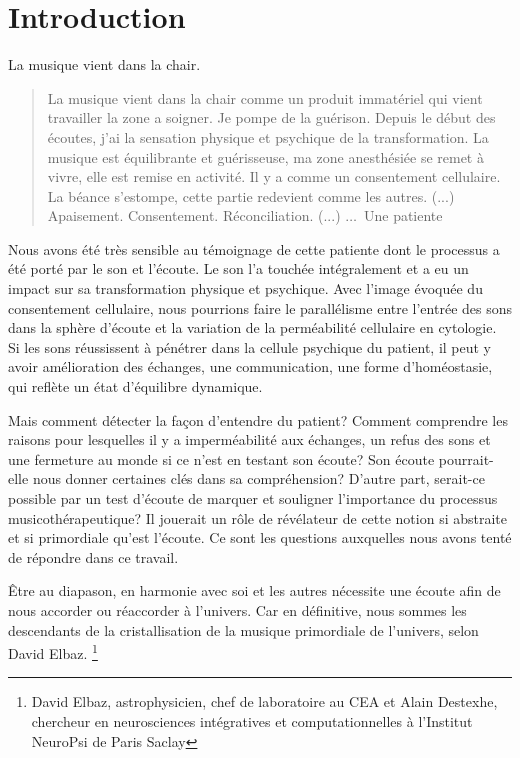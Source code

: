 \chapter{Introduction}

La musique vient dans la chair.

\begin{quotation}
 La musique vient dans la chair comme un produit immatériel
 qui vient travailler la zone a soigner. Je pompe de la
 guérison.
Depuis le début des écoutes, j'ai la sensation physique et
 psychique de la
 transformation.
 La musique est équilibrante et guérisseuse, ma zone
 anesthésiée se remet à vivre, elle est remise en activité.
 Il y a comme un consentement cellulaire.
La béance s'estompe, cette
partie redevient comme les autres. (...)
Apaisement. Consentement. Réconciliation.  (...)
$\ldots$\  Une patiente\autocite{propos d'une patiente}
\end{quotation}

Nous avons été très sensible au témoignage de cette patiente dont le
processus a été porté par le son et l'écoute. Le son l'a touchée intégralement et a eu un impact sur sa transformation physique
et psychique.
Avec l'image évoquée du
consentement cellulaire, nous pourrions faire le
parallélisme entre l'entrée des sons dans la sphère d'écoute et la variation de la 
perméabilité cellulaire en cytologie.\autocite[ch. 3 pp. 70--76]{marieb:biologie}  Si les sons réussissent à pénétrer dans la
cellule psychique du patient, il peut y avoir amélioration des
échanges, une 
communication, une forme d'homéostasie,  \autocite[ch. 1
pp. 10]{marieb:biologie} qui reflète un état d'équilibre dynamique.

Mais comment détecter la façon d'entendre du patient?
Comment comprendre les raisons pour lesquelles il y a imperméabilité aux
échanges, un refus des sons et une fermeture au monde si ce n'est en testant
son écoute?  Son écoute pourrait-elle nous donner certaines clés dans sa
compréhension? D'autre part, serait-ce  possible  par un test d'écoute
de marquer et souligner l'importance du processus musicothérapeutique? 
Il jouerait un
rôle de
révélateur de cette notion si abstraite et si primordiale qu'est l'écoute.
Ce sont les questions auxquelles nous avons tenté de
répondre dans ce travail.


Être au diapason, en harmonie avec soi et les autres
nécessite une écoute afin de nous accorder ou réaccorder à l'univers.
Car en définitive, nous sommes les
descendants de la cristallisation de la musique primordiale de
l'univers, selon
David Elbaz.  \footnote{David Elbaz, astrophysicien, chef de laboratoire au CEA et Alain
Destexhe, chercheur en neurosciences intégratives et computationnelles
à l'Institut  NeuroPsi de Paris Saclay} \autocite{delbaz_recherche_2016}

